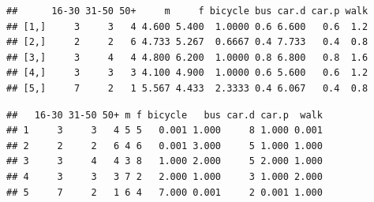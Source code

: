 \begin{Shaded}
\begin{Highlighting}[]
\NormalTok{:}
    \NormalTok{weights1[}\NormalTok{), j] <- all.msim[j, }\NormalTok{]/USd.agg[j, }\NormalTok{]}
    \NormalTok{weights1[} \NormalTok{), j] <- all.msim[j, }\NormalTok{]/USd.agg[j, }
        \NormalTok{]}
    \NormalTok{weights1[}\NormalTok{), j] <- all.msim[j, }\NormalTok{]/USd.agg[j, }\NormalTok{]  ##}
\NormalTok{\}}
\NormalTok{:}
\NormalTok{\}}
\end{Highlighting}
\end{Shaded}
\begin{verbatim}
##      16-30 31-50 50+     m     f bicycle bus car.d car.p walk
## [1,]     3     3   4 4.600 5.400  1.0000 0.6 6.600   0.6  1.2
## [2,]     2     2   6 4.733 5.267  0.6667 0.4 7.733   0.4  0.8
## [3,]     3     4   4 4.800 6.200  1.0000 0.8 6.800   0.8  1.6
## [4,]     3     3   3 4.100 4.900  1.0000 0.6 5.600   0.6  1.2
## [5,]     7     2   1 5.567 4.433  2.3333 0.4 6.067   0.4  0.8
\end{verbatim}
\begin{Shaded}
\begin{Highlighting}[]
\end{Highlighting}
\end{Shaded}
\begin{verbatim}
##   16-30 31-50 50+ m f bicycle   bus car.d car.p  walk
## 1     3     3   4 5 5   0.001 1.000     8 1.000 0.001
## 2     2     2   6 4 6   0.001 3.000     5 1.000 1.000
## 3     3     4   4 3 8   1.000 2.000     5 2.000 1.000
## 4     3     3   3 7 2   2.000 1.000     3 1.000 2.000
## 5     7     2   1 6 4   7.000 0.001     2 0.001 1.000
\end{verbatim}
\begin{Shaded}
\begin{Highlighting}[]
\NormalTok{(}\NormalTok{(}\NormalTok{(} \NormalTok{, }
     \NormalTok{)}
\NormalTok{(} \NormalTok{, } \NormalTok{)}
\end{Highlighting}
\end{Shaded}
